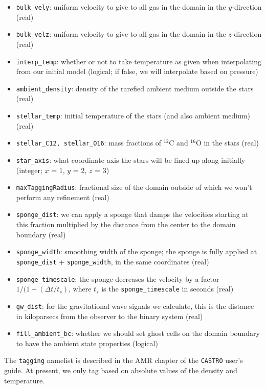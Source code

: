 \documentclass[12pt]{book}
\begin{document}
\begin{itemize}
  \item \texttt{bulk\_vely}: uniform velocity to give to all gas in the domain in the $y$-direction (real)
  \item \texttt{bulk\_velz}: uniform velocity to give to all gas in the domain in the $z$-direction (real)
  \item \texttt{interp\_temp}: whether or not to take temperature as given when interpolating from our initial model (logical;
    if false, we will interpolate based on pressure)
  \item \texttt{ambient\_density}: density of the rarefied ambient medium outside the stars (real)
  \item \texttt{stellar\_temp}: initial temperature of the stars (and also ambient medium) (real)
  \item \texttt{stellar\_C12, stellar\_O16}: mass fractions of ${}^{12}$C and ${}^{16}$O in the stars (real)
  \item \texttt{star\_axis}: what coordinate axis the stars will be lined up along initially (integer; $x$ = 1, $y$ = 2, $z$ = 3)
  \item \texttt{maxTaggingRadius}: fractional size of the domain outside of which we won't perform any refinement (real)
  \item \texttt{sponge\_dist}: we can apply a sponge that damps the velocities starting at this fraction multiplied by the 
    distance from the center to the domain boundary (real)
  \item \texttt{sponge\_width}: smoothing width of the sponge; the sponge is fully applied at {\tt sponge\_dist} + {\tt sponge\_width},
    in the same coordinates (real)
  \item \texttt{sponge\_timescale}: the sponge decreases the velocity by a factor $1 / (1 + (\Delta t / t_s)$, where 
    $t_s$ is the {\tt sponge\_timescale} in seconds (real)
  \item \texttt{gw\_dist}: for the gravitational wave signals we calculate, this is the distance in kiloparsecs from the observer to the binary system (real)
  \item \texttt{fill\_ambient\_bc}: whether we should set ghost cells on the domain boundary to have the ambient state properties (logical)
\end{itemize}

The \texttt{tagging} namelist is described in the AMR chapter of the \texttt{CASTRO} user's guide. At present, we 
only tag based on absolute values of the density and temperature.
\end{document}
